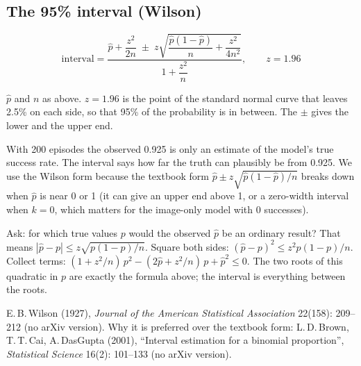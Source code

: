 \subsection{The 95\% interval (Wilson)}
\[\text{interval}=\frac{\hat p+\dfrac{z^2}{2n}\;\pm\;z\sqrt{\dfrac{\hat p(1-\hat p)}{n}+\dfrac{z^2}{4n^2}}}{1+\dfrac{z^2}{n}},\qquad z=1.96\]
\begin{description}[leftmargin=2.6cm,style=nextline]
\item[Symbols] $\hat p$ and $n$ as above. $z=1.96$ is the point of the standard normal curve that leaves 2.5\% on each side, so that 95\% of the probability is in between. The $\pm$ gives the lower and the upper end.
\item[Why] With 200 episodes the observed 0.925 is only an estimate of the model's true success rate. The interval says how far the truth can plausibly be from 0.925. We use the Wilson form because the textbook form $\hat p\pm z\sqrt{\hat p(1-\hat p)/n}$ breaks down when $\hat p$ is near 0 or 1 (it can give an upper end above 1, or a zero-width interval when $k=0$, which matters for the image-only model with 0 successes).
\item[Derivation] Ask: for which true values $p$ would the observed $\hat p$ be an ordinary result? That means $|\hat p-p|\le z\sqrt{p(1-p)/n}$. Square both sides: $(\hat p-p)^2\le z^2p(1-p)/n$. Collect terms: $(1+z^2/n)\,p^2-(2\hat p+z^2/n)\,p+\hat p^2\le 0$. The two roots of this quadratic in $p$ are exactly the formula above; the interval is everything between the roots.
\item[Source] E.\,B.\,Wilson (1927), \emph{Journal of the American Statistical Association} 22(158): 209--212 (no arXiv version). Why it is preferred over the textbook form: L.\,D.\,Brown, T.\,T.\,Cai, A.\,DasGupta (2001), ``Interval estimation for a binomial proportion'', \emph{Statistical Science} 16(2): 101--133 (no arXiv version).
\end{description}

